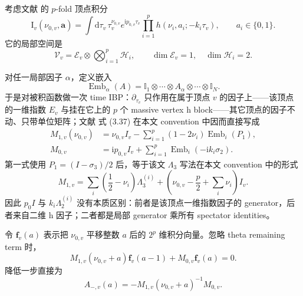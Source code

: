\documentclass[11pt,a4paper]{ctexart}
\newcommand{\dd}{\mathrm d}
\newcommand{\ii}{\mathrm i}
\newcommand{\Id}{\mathbb I}
\newcommand{\cV}{\mathcal V}
\newcommand{\cE}{\mathcal E}
\newcommand{\cH}{\mathcal H}
\newcommand{\Emb}{\operatorname{Emb}}
\begin{document}
考虑文献 \cite{Chen:2023eic} 的 $p$-fold 顶点积分
\begin{equation}
 \text{I}_v(\nu_{0,v},\bm a)
 =\int\dd\tau_v\,
 \tau_v^{\nu_{0,v}}e^{\ii p_{0,v}\tau_v}
 \prod_{i=1}^{p}h(\nu_i,a_i;-k_i\tau_v),
 \qquad a_i\in\{0,1\}.
\end{equation}
它的局部空间是
\begin{equation}
 \cV_v
 =\cE_v
 \otimes\bigotimes_{i=1}^{p}\cH_i,
 \qquad
 \dim\cE_v=1,
 \quad
 \dim\cH_i=2.
 \label{eq:vertex-tensor-space}
\end{equation}

对任一局部因子 $\alpha$，定义嵌入
\begin{equation}
 \Emb_\alpha(A)
 =\Id_1\otimes\cdots\otimes A_\alpha\otimes\cdots\otimes \Id_N.
 \label{eq:embedding-definition}
\end{equation}
于是对被积函数做一次 time IBP：$\partial_{\tau_v}$ 只作用在属于顶点 $v$ 的因子上——该顶点的一维指数 $E_v$ 与挂在它上的 $p$ 个 massive vertex h block——其它顶点的因子不动、只带单位矩阵；文献 \cite{Chen:2023eic} 式 (3.37) 在本文 convention 中因而直接写成
\begin{align}
 M_{1,v}(\nu_{0,v})
 &=\nu_{0,v}I_v
 -\sum_{i=1}^{p}(1-2\nu_i)\Emb_i(P_1),
 \label{eq:massive-M1-projector}\\
 M_{0,v}
 &=\ii p_{0,v}I_v
 +\sum_{i=1}^{p}\Emb_i(-\ii k_i\sigma_2).
 \label{eq:massive-M0-kronecker}
\end{align}
第一式使用 $P_1=(I-\sigma_3)/2$ 后，等于该文 $\Lambda_3$ 写法在本文 convention 中的形式
\begin{equation}
 M_{1,v}
 =\sum_i\left(\frac12-\nu_i\right)\Lambda_3^{(i)}
 +\left(\nu_{0,v}-\frac p2+\sum_i\nu_i\right)I_v.
\end{equation}
因此 $p_0I$ 与 $k_i\Lambda_2^{(i)}$ 没有本质区别：前者是该顶点一维指数因子的 generator，后者来自二维 h 因子；二者都是局部 generator 乘所有 spectator identities。

令 $\bm f_v(a)$ 表示把 $\nu_{0,v}$ 平移整数 $a$ 后的 $2^p$ 维积分向量。忽略 theta remaining term 时，
\begin{equation}
 M_{1,v}(\nu_{0,v}+a)\bm f_v(a-1)
 +M_{0,v}\bm f_v(a)=0.
 \label{eq:massive-vertex-ibp}
\end{equation}
降低一步直接为
\begin{equation}
 A_{-,v}(a)
 =-M_{1,v}(\nu_{0,v}+a)^{-1}M_{0,v}.
 \label{eq:Aminus-local}
\end{equation}
\end{document}
